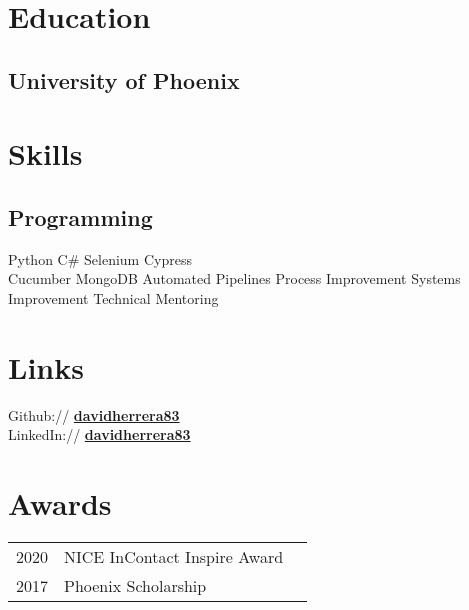 \documentclass[]{deedy-resume-openfont}
\begin{document}
%
%
\lastupdated
%
%
%
%
\begin{minipage}[t]{0.33\textwidth} 
\section{Education} 
\subsection{University of Phoenix}
\sectionsep
\section{Skills}
\subsection{Programming}
Python \textbullet{} {C\#} \textbullet{} Selenium \textbullet{} Cypress \\
Cucumber \textbullet{} MongoDB \textbullet{} Automated Pipelines
Process Improvement \textbullet{} Systems Improvement \textbullet{} Technical Mentoring
\sectionsep
\section{Links} 
Github:// \href{https://github.com/davidherrera83}{\bf davidherrera83} \\
LinkedIn:// \href{https://www.linkedin.com/in/davidherrera83}{\bf davidherrera83} \\
\sectionsep
\section{Awards} 
\begin{tabular}{rll}
2020	     & NICE InContact Inspire Award\\
2017	     & Phoenix Scholarship\\
\end{tabular}
\sectionsep

\end{minipage}
\end{document}
